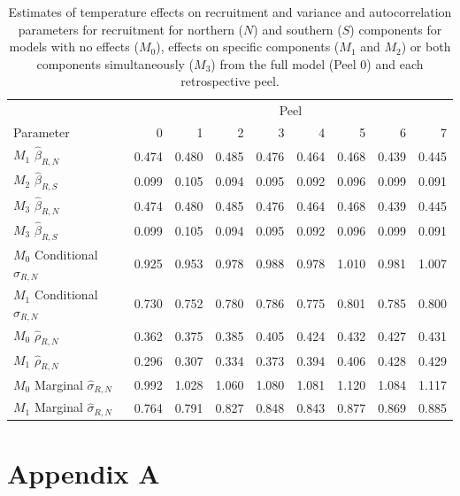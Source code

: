 \documentclass[
]{article}
\begin{document}
\begin{table}

\caption{\label{tab:beta-sig-peel-table}Estimates of temperature effects on recruitment and variance and autocorrelation parameters for recruitment for northern ($N$) and southern ($S$) components for models with no effects ($M_0$), effects on specific components ($M_1$ and $M_2$) or both components simultaneously ($M_3$) from the full model (Peel 0) and each retrospective peel.}
\centering
\begin{tabular}[t]{lrrrrrrrr}
\toprule
\multicolumn{1}{c}{ } & \multicolumn{8}{c}{Peel} \\
\cmidrule(l{3pt}r{3pt}){2-9}
Parameter & 0 & 1 & 2 & 3 & 4 & 5 & 6 & 7\\
\midrule
$M_{1}$ $\widehat{\beta}_{R,N}$ & 0.474 & 0.480 & 0.485 & 0.476 & 0.464 & 0.468 & 0.439 & 0.445\\
$M_{2}$ $\widehat{\beta}_{R,S}$ & 0.099 & 0.105 & 0.094 & 0.095 & 0.092 & 0.096 & 0.099 & 0.091\\
$M_{3}$ $\widehat{\beta}_{R,N}$ & 0.474 & 0.480 & 0.485 & 0.476 & 0.464 & 0.468 & 0.439 & 0.445\\
$M_{3}$ $\widehat{\beta}_{R,S}$ & 0.099 & 0.105 & 0.094 & 0.095 & 0.092 & 0.096 & 0.099 & 0.091\\
$M_{0}$ Conditional $\widehat{\sigma}_{R,N}$ & 0.925 & 0.953 & 0.978 & 0.988 & 0.978 & 1.010 & 0.981 & 1.007\\
\addlinespace
$M_{1}$ Conditional $\widehat{\sigma}_{R,N}$ & 0.730 & 0.752 & 0.780 & 0.786 & 0.775 & 0.801 & 0.785 & 0.800\\
$M_{0}$ $\widehat{\rho}_{R,N}$ & 0.362 & 0.375 & 0.385 & 0.405 & 0.424 & 0.432 & 0.427 & 0.431\\
$M_{1}$ $\widehat{\rho}_{R,N}$ & 0.296 & 0.307 & 0.334 & 0.373 & 0.394 & 0.406 & 0.428 & 0.429\\
$M_{0}$ Marginal $\widehat{\sigma}_{R,N}$ & 0.992 & 1.028 & 1.060 & 1.080 & 1.081 & 1.120 & 1.084 & 1.117\\
$M_{1}$ Marginal $\widehat{\sigma}_{R,N}$ & 0.764 & 0.791 & 0.827 & 0.848 & 0.843 & 0.877 & 0.869 & 0.885\\
\bottomrule
\end{tabular}
\end{table}

\clearpage

\hypertarget{appendix-a}{%
\section*{Appendix A}\label{appendix-a}}
\end{document}
